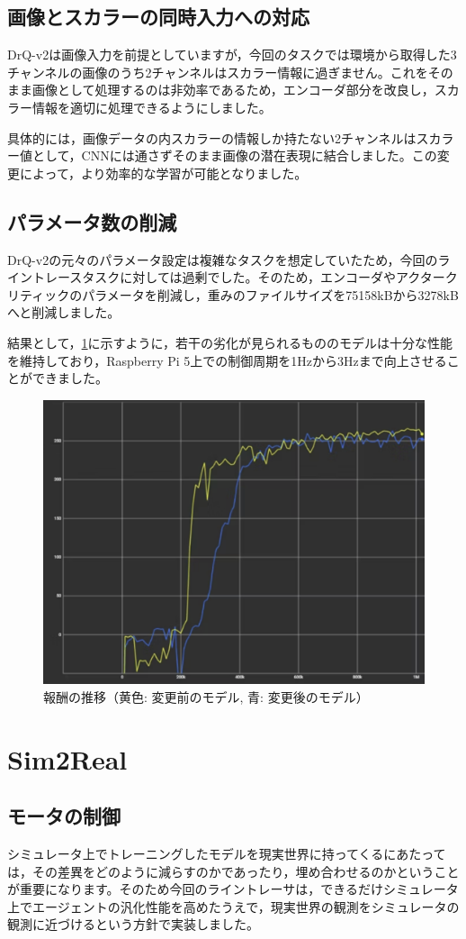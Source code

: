 \documentclass{jsbook}
\numberwithin{equation}{section}
\begin{document}
\subsection{画像とスカラーの同時入力への対応}
DrQ-v2は画像入力を前提としていますが，今回のタスクでは環境から取得した3チャンネルの画像のうち2チャンネルはスカラー情報に過ぎません。これをそのまま画像として処理するのは非効率であるため，エンコーダ部分を改良し，スカラー情報を適切に処理できるようにしました。

具体的には，画像データの内スカラーの情報しか持たない2チャンネルはスカラー値として，CNNには通さずそのまま画像の潜在表現に結合しました。この変更によって，より効率的な学習が可能となりました。

\subsection{パラメータ数の削減}
DrQ-v2の元々のパラメータ設定は複雑なタスクを想定していたため，今回のライントレースタスクに対しては過剰でした。そのため，エンコーダやアクタークリティックのパラメータを削減し，重みのファイルサイズを75158kBから3278kBへと削減しました。

結果として，\ref{fig:image5}に示すように，若干の劣化が見られるもののモデルは十分な性能を維持しており，Raspberry Pi 5上での制御周期を1Hzから3Hzまで向上させることができました。
\begin{figure}[h]
  \centering
  \includegraphics[width=0.7\hsize]{fig/image5.png}
  \caption{報酬の推移（黄色: 変更前のモデル, 青: 変更後のモデル）}
  \label{fig:image5}
\end{figure}

\section{Sim2Real}

\subsection{モータの制御}
シミュレータ上でトレーニングしたモデルを現実世界に持ってくるにあたっては，その差異をどのように減らすのかであったり，埋め合わせるのかということが重要になります。そのため今回のライントレーサは，できるだけシミュレータ上でエージェントの汎化性能を高めたうえで，現実世界の観測をシミュレータの観測に近づけるという方針で実装しました。
\end{document}
